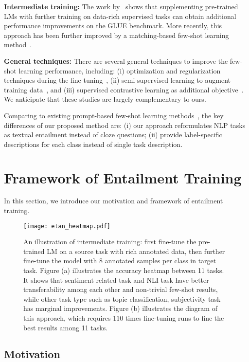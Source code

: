 \documentclass{article}
\begin{document}
\textbf{Intermediate training:} The work by~\citep{phang2018sentence} shows that supplementing pre-trained LMs with further training on data-rich supervised tasks can obtain additional performance improvements on the GLUE benchmark. More recently, this approach has been further improved by a matching-based few-shot learning method~\citep{yin2020universal}.

\textbf{General techniques:} There are several general techniques to improve the few-shot learning performance, including: (i) optimization and regularization techniques during the fine-tuning~\citep{howard2018universal,lee2019mixout,zhang2020revisiting}, (ii) semi-supervised learning to augment training data~\citep{xie2020unsupervised}, and (iii) supervised contrastive learning as additional objective~\citep{gunel2020supervised}. We anticipate that these studies are largely complementary to ours.

Comparing to existing prompt-based few-shot learning methods~\citep{brown2020language,schick2020exploiting,gao2020making}, the key differences of our proposed method are: (i) our approach reformulates NLP tasks as textual entailment instead of cloze questions; (ii) provide label-specific descriptions for each class instead of single task description.

\section{Framework of Entailment Training}

In this section, we introduce our motivation and framework of entailment training.

\begin{figure*}[t]
  \centering
  \texttt{[image: etan\_heatmap.pdf]}
  \caption{An illustration of intermediate training: first fine-tune the pre-trained LM on a source task with rich annotated data, then further fine-tune the model with 8 annotated samples per class in target task. Figure (a) illustrates the accuracy heatmap between 11 tasks. It shows that sentiment-related task and NLI task have better transferability among each other and non-trivial few-shot results, while other task type such as topic classification, subjectivity task has marginal improvements. Figure (b) illustrates the diagram of this approach, which requires 110 times fine-tuning runs to fine the best results among 11 tasks.}
  \label{fig:motivation}
\end{figure*}

\subsection{Motivation}
\end{document}
